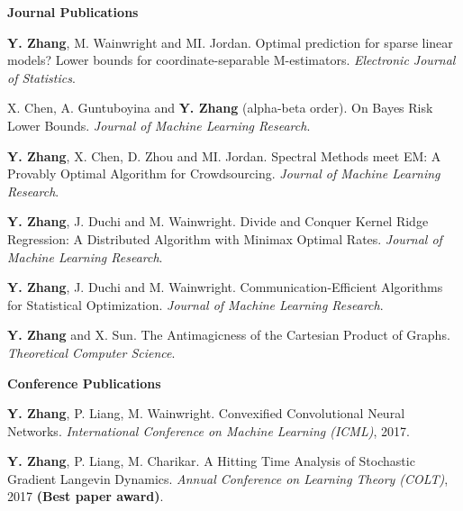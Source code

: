 \documentclass{res} %
\begin{document}
\begin{resume}
{\bf\Large Journal Publications}
\vspace{5pt}

\begin{enumerate}[label={[J\arabic*]}, ref={J\arabic*}]

\item \textbf{Y. Zhang}, M. Wainwright and MI. Jordan. Optimal prediction for sparse linear models? Lower bounds for coordinate-separable M-estimators.\label{optimality-ejs}
\emph{Electronic Journal of Statistics}.

\item X. Chen, A. Guntuboyina and \textbf{Y. Zhang} (alpha-beta order). On Bayes Risk Lower Bounds.
\emph{Journal of Machine Learning Research}.\label{on-bayes-jmlr}

\item \textbf{Y. Zhang}, X. Chen, D. Zhou and MI. Jordan. Spectral Methods meet EM: A Provably Optimal Algorithm for Crowdsourcing.
\emph{Journal of Machine Learning Research}.\label{spectral-jmlr}

\item \textbf{Y. Zhang}, J. Duchi and M. Wainwright. Divide and Conquer Kernel Ridge Regression: A Distributed Algorithm with Minimax Optimal Rates.
\emph{Journal of Machine Learning Research}.\label{divide-jmlr}

\item \textbf{Y. Zhang}, J. Duchi and M. Wainwright. Communication-Efficient Algorithms for Statistical Optimization.
\emph{Journal of Machine Learning Research}.\label{communication-jmlr}

\item \textbf{Y. Zhang} and X. Sun. The Antimagicness of the Cartesian Product of Graphs.
\emph{Theoretical Computer Science}.\label{the-antimagicness-tcs}
\end{enumerate}

{\bf\Large Conference Publications}
\vspace{5pt}

\begin{enumerate}[label={[C\arabic*]}, ref={C\arabic*}]

\item  \textbf{Y. Zhang}, P. Liang, M. Wainwright. Convexified Convolutional Neural Networks.
\emph{International Conference on Machine Learning (ICML)}, 2017. \label{convexified-icml17}

\item  \textbf{Y. Zhang}, P. Liang, M. Charikar. A Hitting Time Analysis of Stochastic Gradient Langevin Dynamics.
\emph{Annual Conference on Learning Theory (COLT)}, 2017 {\bf (Best paper award)}. \label{a-hitting-colt17}


\end{enumerate}
\end{resume}
\end{document}
